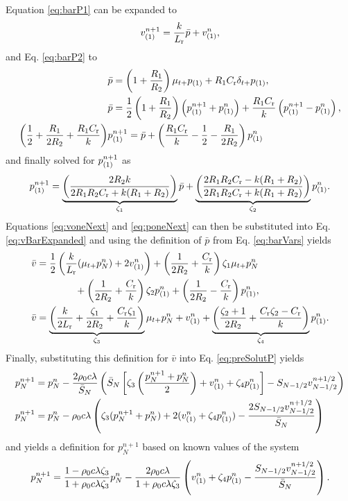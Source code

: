 {Equation \eqref{eq:barP1} can be expanded to 
\begin{equation}\label{eq:voneNext}
    v_{(1)}^{n+1} = \frac{k}{L_{\text{r}}}\bar p + v_{(1)}^n ,
\end{equation}
and Eq. \eqref{eq:barP2} to 
\begin{align*}
    &\bar p =\left(1+\frac{R_1}{R_2}\right)\mu_{t+}p_{(1)}+ R_1 C_{\text{r}}\delta_{t+}p_{(1)},\\
    &\bar p =\frac{1}{2}\left(1+\frac{R_1}{R_2}\right)\left(p_{(1)}^{n+1} + p_{(1)}^n\right) + \frac{R_1C_{\text{r}}}{k}\left(p_{(1)}^{n+1} - p_{(1)}^n\right),\\
    \left(\frac{1}{2}+\frac{R_1}{2R_2} + \frac{R_1C_{\text{r}}}{k}\right)&p_{(1)}^{n+1} = \bar p + \left(\frac{R_1C_{\text{r}}}{k} - \frac{1}{2} - \frac{R_1}{2R_2}\right)p_{(1)}^n
\end{align*}
and finally solved for $p_{(1)}^{n+1}$ as
\begin{equation}\label{eq:poneNext}
    p_{(1)}^{n+1} = \underbrace{\left(\frac{2R_2k}{2R_1R_2C_{\text{r}} + k(R_1 + R_2)}\right)}_{\zeta_1}\bar p + \underbrace{\left(\frac{2R_1R_2C_{\text{r}} - k(R_1 + R_2)}{2R_1R_2C_{\text{r}} + k(R_1 + R_2)}\right)}_{\zeta_2} p_{(1)}^n .
\end{equation}
Equations \eqref{eq:voneNext} and \eqref{eq:poneNext} can then be substituted into Eq. \eqref{eq:vBarExpanded} and using the definition of $\bar p$ from Eq. \eqref{eq:barVars} yields
\begin{align}
    \bar v &= \frac{1}{2}\left(\frac{k}{L_{\text{r}}}(\mu_{t+}p_N^n) + 2v_{(1)}^n\right)+\left(\frac{1}{2R_2} + \frac{C_{\text{r}}}{k}\right)\zeta_1\mu_{t+}p_N^n\nonumber \\
    & \qquad\qquad+ \left(\frac{1}{2R_2} + \frac{C_{\text{r}}}{k}\right)\zeta_2p_{(1)}^n + \left(\frac{1}{2R_2} - \frac{C_{\text{r}}}{k}\right)p_{(1)}^n\nonumber,\\
    \bar v &= \underbrace{\left(\frac{k}{2L_{\text{r}}} + \frac{\zeta_1}{2R_2}+\frac{C_{\text{r}}\zeta_1}{k}\right)}_{\zeta_3}\mu_{t+}p_N^n + v_{(1)}^n + \underbrace{\left(\frac{\zeta_2+1}{2R_2} + \frac{C_{\text{r}}\zeta_2 - C_{\text{r}}}{k}\right)}_{\zeta_4}p_{(1)}^n.
\end{align}
Finally, substituting this definition for $\bar v$ into Eq. \eqref{eq:preSolutP} yields
\begin{align}
    p_N^{n+1} &= p_N^n - \frac{2\rho_0c\lambda}{\bar S_N}\left(\bar S_N
    \left[\zeta_3\left(\frac{p_N^{n+1} + p_N^n}{2}\right) + v_{(1)}^n + \zeta_4p_{(1)}^n\right] - S_{N-1/2}v_{N-1/2}^{n+1/2}\right)\nonumber\\
    p_N^{n+1} &= p_N^n - \rho_0c\lambda\left(\zeta_3(p_N^{n+1} + p_N^n) + 2(v_{(1)}^n + \zeta_4p_{(1)}^n)-\frac{2S_{N-1/2}v_{N-1/2}^{n+1/2}}{\bar S_N}\right)\nonumber
\end{align}
and yields a definition for $p_N^{n+1}$ based on known values of the system 
\begin{equation}
    p_N^{n+1} = \frac{1 - \rho_0c\lambda\zeta_3}{1+\rho_0c\lambda\zeta_3}p_N^n - \frac{2\rho_0c\lambda}{1+\rho_0c\lambda\zeta_3} \left( v_{(1)}^n+\zeta_4p_{(1)}^n - \frac{S_{N-1/2}v_{N-1/2}^{n+1/2}}{\bar S_N}\right).
\end{equation}
}
